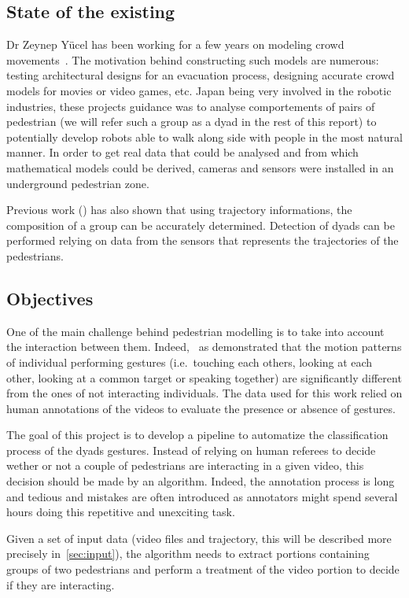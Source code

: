 \documentclass[12pt,a4paper,twoside]{article}
\begin{document}
\subsection{State of the existing}
Dr Zeynep Yücel has been working for a few years on modeling crowd movements~\cite{Zanlungo2017}\cite{Yucel2013}\cite{Yucel2017}. The motivation behind constructing such models are numerous: testing architectural designs for an evacuation process, designing accurate crowd models for movies or video games, etc. Japan being very involved in the robotic industries, these projects guidance was to analyse comportements of pairs of pedestrian (we will refer such a group as a dyad in the rest of this report) to potentially develop robots able to walk along side with people in the most natural manner. In order to get real data that could be analysed and from which mathematical models could be derived, cameras and sensors were installed in an underground pedestrian zone. 

Previous work (\cite{Yucel2013}) has also shown that using trajectory informations, the composition of a group can be accurately determined. Detection of dyads can be performed relying on data from the sensors that represents the trajectories of the pedestrians.

\subsection{Objectives}
One of the main challenge behind pedestrian modelling is to take into account the interaction between them. Indeed,~\cite{Yucel2017} as demonstrated that the motion patterns of individual performing gestures (i.e.~touching each others, looking at each other, looking at a common target or speaking together) are significantly different from the ones of not interacting individuals. The data used for this work relied on human annotations of the videos to evaluate the presence or absence of gestures.

The goal of this project is to develop a pipeline to automatize the classification process of the dyads gestures. Instead of relying on human referees to decide wether or not a couple of pedestrians are interacting in a given video, this decision should be made by an algorithm. Indeed, the annotation process is long and tedious and mistakes are often introduced as annotators might spend several hours doing this repetitive and unexciting task.

Given a set of input data (video files and trajectory, this will be described more precisely in~\ref{sec:input}), the algorithm needs to extract portions containing groups of two pedestrians and perform a treatment of the video portion to decide if they are interacting.
\end{document}
